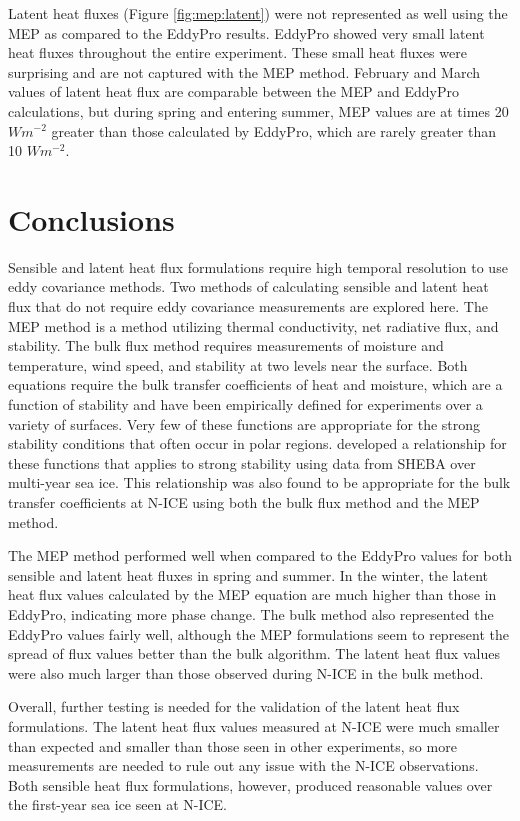 Latent heat fluxes (Figure \ref{fig:mep:latent}) were not represented as well using the MEP as compared to the EddyPro results. EddyPro showed very small latent heat fluxes throughout the entire experiment. These small heat fluxes were surprising and are not captured with the MEP method. February and March values of latent heat flux are comparable between the MEP and EddyPro calculations, but during spring and entering summer, MEP values are at times 20 $Wm^{-2}$ greater than those calculated by EddyPro, which are rarely greater than 10 $Wm^{-2}$.

\section{Conclusions}
Sensible and latent heat flux formulations require high temporal resolution to use eddy covariance methods. Two methods of calculating sensible and latent heat flux that do not require eddy covariance measurements are explored here. The MEP method is a method utilizing thermal conductivity, net radiative flux, and stability. The bulk flux method requires measurements of moisture and temperature, wind speed, and stability at two levels near the surface. Both equations require the bulk transfer coefficients of heat and moisture, which are a function of stability and have been empirically defined for experiments over a variety of surfaces. Very few of these functions are appropriate for the strong stability conditions that often occur in polar regions. \citet{andreas:311} developed a relationship for these functions that applies to strong stability using data from SHEBA over multi-year sea ice. This relationship was also found to be appropriate for the bulk transfer coefficients at N-ICE using both the bulk flux method and the MEP method. 

The MEP method performed well when compared to the EddyPro values for both sensible and latent heat fluxes in spring and summer. In the winter, the latent heat flux values calculated by the MEP equation are much higher than those in EddyPro, indicating more phase change. The bulk method also represented the EddyPro values fairly well, although the MEP formulations seem to represent the spread of flux values better than the bulk algorithm. The latent heat flux values were also much larger than those observed during N-ICE in the bulk method. 

Overall, further testing is needed for the validation of the latent heat flux formulations. The latent heat flux values measured at N-ICE were much smaller than expected and smaller than those seen in other experiments, so more measurements are needed to rule out any issue with the N-ICE observations. Both sensible heat flux formulations, however, produced reasonable values over the first-year sea ice seen at N-ICE. 



